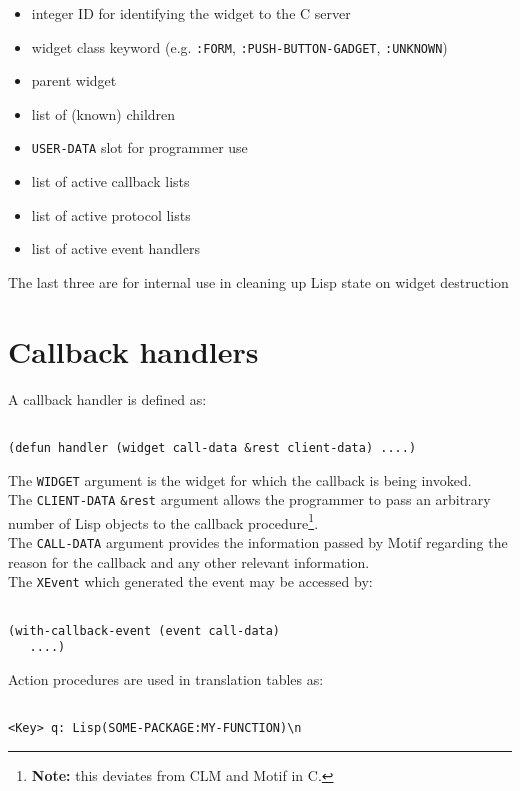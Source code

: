 \documentclass{article}
\begin{document}
\begin{itemize}
\item integer ID for identifying the widget to the C server
\item widget class keyword (e.g. \texttt{:FORM},
      \texttt{:PUSH-BUTTON-GADGET}, \texttt{:UNKNOWN})
\item parent widget
\item list of (known) children
\item \texttt{USER-DATA} slot for programmer use
\item list of active callback lists
\item list of active protocol lists
\item list of active event handlers
\end{itemize}
The last three are for internal use in cleaning up Lisp state on
widget destruction


\section{Callback handlers}

A callback handler is defined as:

\begin{verbatim}

(defun handler (widget call-data &rest client-data) ....)

\end{verbatim}

\noindent
The \texttt{WIDGET} argument is the widget for which the callback is
being invoked.\\
The \texttt{CLIENT-DATA} \texttt{\&rest} argument allows the
programmer to pass an 
arbitrary number of Lisp objects to the callback
procedure\footnote{\textbf{Note:} this deviates from CLM and Motif in C.}.\\
The \texttt{CALL-DATA} argument provides the information passed by Motif
regarding the reason for the callback and any other relevant
information.\\
The \texttt{XEvent} which generated the event may be accessed by:

\begin{verbatim}

(with-callback-event (event call-data)
   ....)

\end{verbatim}

\noindent
Action procedures are used in translation tables as:

\begin{verbatim}

<Key> q: Lisp(SOME-PACKAGE:MY-FUNCTION)\n

\end{verbatim}
\end{document}

